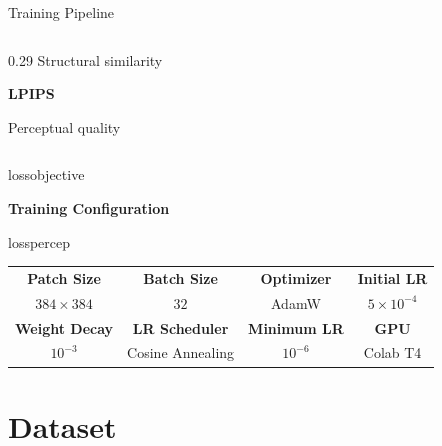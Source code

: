 ﻿\documentclass[
    11pt,%
    aspectratio=169,%
]{beamer}
\begin{document}
\begin{frame}{Training Pipeline}
\begin{columns}[T,onlytextwidth]
\begin{column}{0.29\textwidth}
Structural similarity

\vspace{0.10cm}

{\color{LossNavy}\bfseries\large LPIPS}

Perceptual quality

\end{column}

\end{columns}


\vspace{0.10cm}

\begin{beamercolorbox}[
    wd=\textwidth,
    sep=0.07cm,
    rounded=true
]{lossobjective}

    \centering
    {\color{LossNavy}\bfseries Training Configuration}

\end{beamercolorbox}

\vspace{0.03cm}

\begin{beamercolorbox}[
    wd=\textwidth,
    sep=0.04cm
]{losspercep}

\centering

\renewcommand{\arraystretch}{1.15}

\fontsize{7.5}{9}\selectfont

\begin{tabular}{cccc}
\textbf{Patch Size} &
\textbf{Batch Size} &
\textbf{Optimizer} &
\textbf{Initial LR} \\

$384\times384$ &
$32$ &
AdamW &
$5\times10^{-4}$ \\

\hline

\textbf{Weight Decay} &
\textbf{LR Scheduler} &
\textbf{Minimum LR} &
\textbf{GPU} \\

$10^{-3}$ &
Cosine Annealing &
$10^{-6}$ &
Colab T4

\end{tabular}

\end{beamercolorbox}

\end{frame}

\section{Dataset}
 
\end{document}
